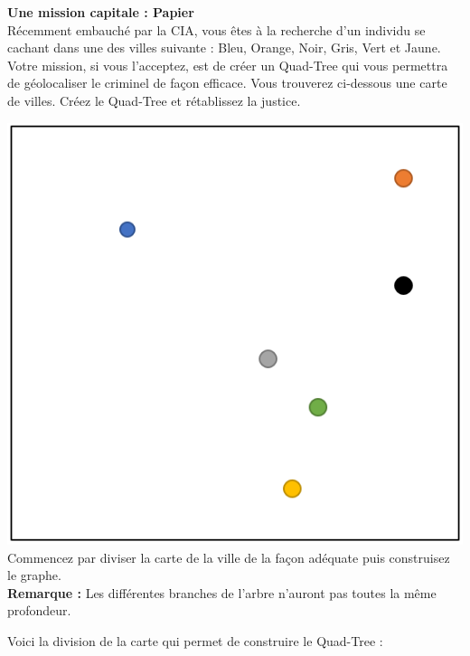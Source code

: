 \begin{Exercice}[10 minutes]\textbf{Une mission capitale : Papier}\\

Récemment embauché par la CIA, vous êtes à la recherche d'un individu se cachant dans une des villes suivante : Bleu, Orange, Noir, Gris, Vert et Jaune. Votre mission, si vous l'acceptez, est de créer un Quad-Tree qui vous permettra de géolocaliser le criminel de façon efficace. Vous trouverez ci-dessous une carte de villes. Créez le Quad-Tree et rétablissez la justice.\\


\begin{conseil}
    \includegraphics[scale=0.9]{Quad-Tree3.PNG}
    \\Commencez par diviser la carte de la ville de la façon adéquate puis construisez le graphe.\\
    
    \textbf{Remarque : }Les différentes branches de l'arbre n'auront pas toutes la même profondeur.
\end{conseil}
\begin{solution}
    Voici la division de la carte qui permet de construire le Quad-Tree :\\
    

\end{solution}
\end{Exercice}
